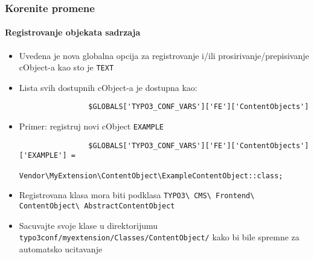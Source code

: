 
\begin{frame}[fragile]
	\frametitle{Korenite promene}
	\framesubtitle{Registrovanje objekata sadrzaja}

	\begin{itemize}

		\item Uvedena je nova globalna opcija za registrovanje i/ili prosirivanje/prepisivanje cObject-a kao sto je \texttt{TEXT}

		\item Lista svih dostupnih cObject-a je dostupna kao:

			\begin{lstlisting}
				$GLOBALS['TYPO3_CONF_VARS']['FE']['ContentObjects']
			\end{lstlisting}

		\item Primer: registruj novi cObject \texttt{EXAMPLE}

			\begin{lstlisting}
				$GLOBALS['TYPO3_CONF_VARS']['FE']['ContentObjects']['EXAMPLE'] =
				  Vendor\MyExtension\ContentObject\ExampleContentObject::class;
			\end{lstlisting}

		\item Registrovana klasa mora biti podklasa
			\small
				\texttt{TYPO3\textbackslash
					CMS\textbackslash
					Frontend\textbackslash
					ContentObject\textbackslash
					AbstractContentObject}
			\normalsize

		\item Sacuvajte svoje klase u direktorijumu\newline
			\small
				\texttt{typo3conf/myextension/Classes/ContentObject/}
			\normalsize\newline
			kako bi bile spremne za automatsko ucitavanje

	\end{itemize}

\end{frame}


